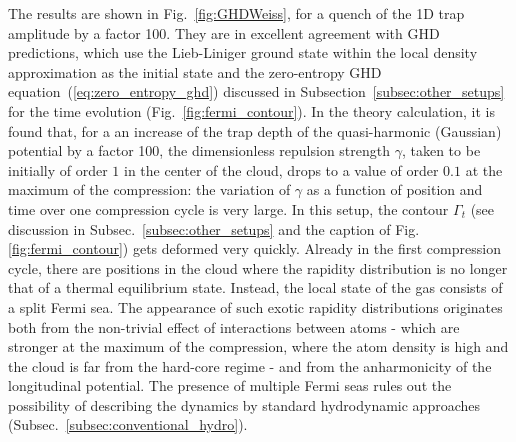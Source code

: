 \documentclass[onecolumn,amsfonts,showpacs,superscriptaddress]{revtex4-1}
\begin{document}
The results are shown in Fig.~\ref{fig:GHDWeiss}, for a quench of the 1D trap amplitude by a factor 100. They are in excellent agreement with GHD predictions, which use the Lieb-Liniger ground state within the local density approximation as the initial state and the zero-entropy GHD equation~(\ref{eq:zero_entropy_ghd}) discussed in Subsection~\ref{subsec:other_setups} for the time evolution (Fig.~\ref{fig:fermi_contour}). In the theory calculation, it is found that, for a an increase of the trap depth of the quasi-harmonic (Gaussian) potential by a factor 100, the dimensionless repulsion strength $\gamma$, taken to be initially of order $1$ in the center of the cloud, drops to a value of order $0.1$ at the maximum of the compression: the variation of $\gamma$ as a function of position and time over one compression cycle is very large. In this setup, the contour $\Gamma_t$ (see discussion in Subsec.~\ref{subsec:other_setups} and the caption of Fig.~ \ref{fig:fermi_contour}) gets deformed very quickly. Already in the first compression cycle, there are positions in the cloud where the rapidity distribution is no longer that of a thermal equilibrium state. Instead, the local state of the gas consists of a split Fermi sea. The appearance of such exotic rapidity distributions originates both from the non-trivial effect of interactions between atoms - which are stronger at the maximum of the compression, where the atom density is high and the cloud is far from the hard-core regime - and from the anharmonicity of the longitudinal potential.
The presence of multiple Fermi seas rules out the possibility of describing the dynamics by standard hydrodynamic approaches (Subsec.~\ref{subsec:conventional_hydro}).
\end{document}
